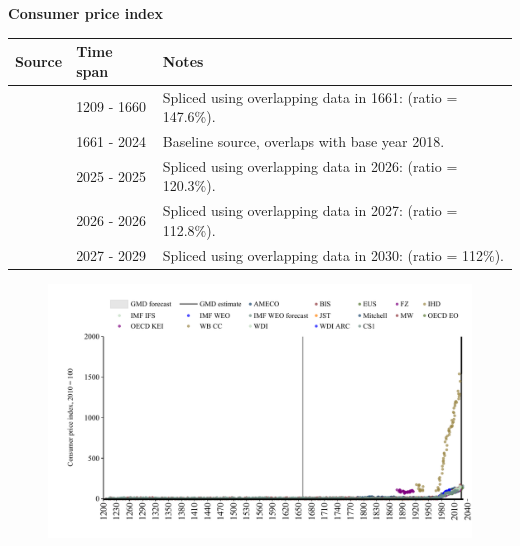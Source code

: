 \documentclass[12pt,a4paper,landscape]{article}
\begin{document}
\begin{adjustbox}{max totalsize={\paperwidth}{\paperheight},center}
\begin{minipage}[t][\textheight][t]{\textwidth}
\vspace*{0.5cm}
{}
\begin{center}
{\Large\bfseries Consumer price index}
\end{center}
\vspace{0.5cm}
\begin{table}[H]
\centering
\small
\begin{tabular}{|l|l|l|}
\hline
\textbf{Source} & \textbf{Time span} & \textbf{Notes} \\
\hline
\rowcolor{white}\cite{CS1_GBR}& 1209 - 1660 &Spliced using overlapping data in 1661: (ratio = 147.6\%). \\
\rowcolor{lightgray}\cite{BIS}& 1661 - 2024 &Baseline source, overlaps with base year 2018. \\
\rowcolor{white}\cite{OECD_EO}& 2025 - 2025 &Spliced using overlapping data in 2026: (ratio = 120.3\%). \\
\rowcolor{lightgray}\cite{AMECO}& 2026 - 2026 &Spliced using overlapping data in 2027: (ratio = 112.8\%). \\
\rowcolor{white}\cite{IMF_WEO_forecast}& 2027 - 2029 &Spliced using overlapping data in 2030: (ratio = 112\%). \\
\hline
\end{tabular}
\end{table}
\begin{figure}[H]
\centering
\includegraphics[width=\textwidth,height=0.6\textheight,keepaspectratio]{graphs/GBR_CPI.pdf}
\end{figure}
\end{minipage}
\end{adjustbox}
\end{document}
